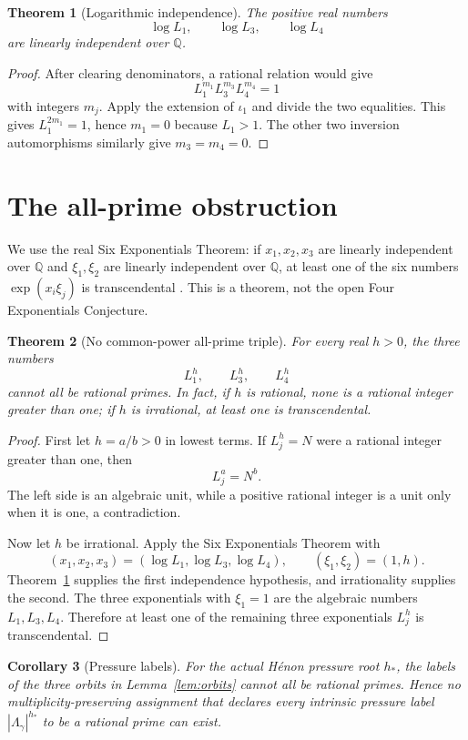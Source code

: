 \documentclass[11pt]{article}
\newtheorem{theorem}{Theorem}[section]
\newtheorem{corollary}[theorem]{Corollary}
\theoremstyle{remark}\newtheorem{remark}[theorem]{Remark}
\begin{document}
\begin{theorem}[Logarithmic independence]\label{thm:logs}
The positive real numbers
\[
\log L_1,\qquad\log L_3,\qquad\log L_4
\]
are linearly independent over $\mathbb Q$.
\end{theorem}
\begin{proof}
After clearing denominators, a rational relation would give
\[
L_1^{m_1}L_3^{m_3}L_4^{m_4}=1
\]
with integers $m_j$.  Apply the extension of $\iota_1$ and divide the two
equalities.  This gives $L_1^{2m_1}=1$, hence $m_1=0$ because $L_1>1$.
The other two inversion automorphisms similarly give $m_3=m_4=0$.
\end{proof}

\section{The all-prime obstruction}
We use the real Six Exponentials Theorem: if $x_1,x_2,x_3$ are linearly
independent over $\mathbb Q$ and $\xi_1,\xi_2$ are linearly independent over
$\mathbb Q$, at least one of the six numbers $\exp(x_i\xi_j)$ is
transcendental \cite[Theorem~3.1]{Pila}.  This is a theorem, not the open Four
Exponentials Conjecture.

\begin{theorem}[No common-power all-prime triple]\label{thm:main}
For every real $h>0$, the three numbers
\[
L_1^h,\qquad L_3^h,\qquad L_4^h
\]
cannot all be rational primes.  In fact, if $h$ is rational, none is a
rational integer greater than one; if $h$ is irrational, at least one is
transcendental.
\end{theorem}
\begin{proof}
First let $h=a/b>0$ in lowest terms.  If $L_j^h=N$ were a rational integer
greater than one, then
\[
L_j^a=N^b.
\]
The left side is an algebraic unit, while a positive rational integer is a
unit only when it is one, a contradiction.

Now let $h$ be irrational.  Apply the Six Exponentials Theorem with
\[
(x_1,x_2,x_3)=(\log L_1,\log L_3,\log L_4),
\qquad (\xi_1,\xi_2)=(1,h).
\]
Theorem~\ref{thm:logs} supplies the first independence hypothesis, and
irrationality supplies the second.  The three exponentials with $\xi_1=1$
are the algebraic numbers $L_1,L_3,L_4$.  Therefore at least one of the
remaining three exponentials $L_j^h$ is transcendental.
\end{proof}

\begin{corollary}[Pressure labels]\label{cor:pressure}
For the actual H\'enon pressure root $h_*$, the labels of the three orbits in
Lemma~\ref{lem:orbits} cannot all be rational primes.  Hence no
multiplicity-preserving assignment that declares every intrinsic pressure
label $|\Lambda_\gamma|^{h_*}$ to be a rational prime can exist.
\end{corollary}
\end{document}
